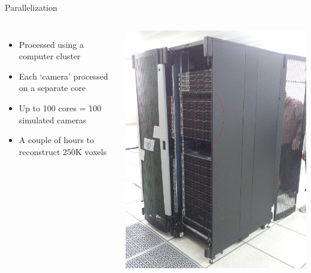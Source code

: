 \documentclass[compress,red,12pt]{beamer}
\begin{document}
\begin{frame}{Parallelization} 
  \begin{columns}
    \begin{itemize}
    \item Processed using a computer cluster
    \item Each `camera' processed on a separate core
    \item Up to 100 cores = 100 simulated cameras
    \item A couple of hours to reconstruct 250K voxels
    \end{itemize}

    \begin{center}
      \includegraphics[width=\columnwidth]{tamnun.jpg}
    \end{center}
  \end{columns}
\end{frame}
\end{document}
